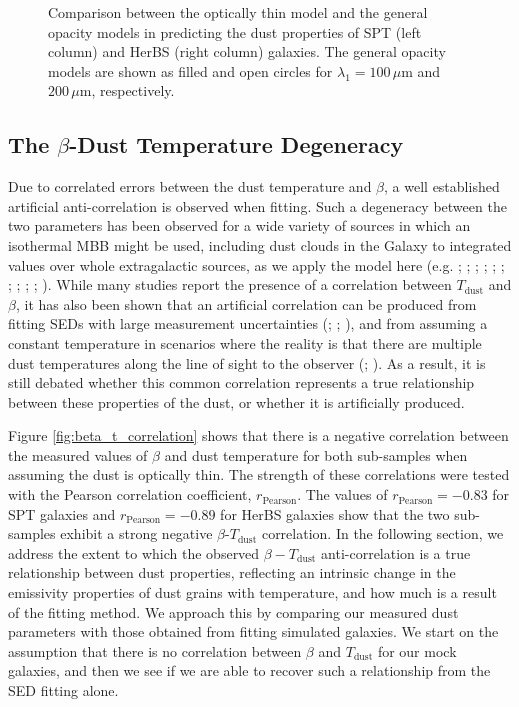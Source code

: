 \begin{figure}
	\caption[Comparison of best fitting optically thin and general opacity parameters]{Comparison between the optically thin model and the general opacity models in predicting the dust properties of SPT (left column) and HerBS (right column) galaxies. The general opacity models are shown as filled and open circles for $\lambda_1 = 100\,\mu$m and $200\,\mu$m, respectively.}
	\label{fig:comparison_optically_thin_general_opacity}
\end{figure}

\subsection{The $\beta$-Dust Temperature Degeneracy}

Due to correlated errors between the dust temperature and $\beta$, a well established artificial anti-correlation is observed when fitting. Such a degeneracy between the two parameters has been observed for a wide variety of sources in which an isothermal MBB might be used, including dust clouds in the Galaxy to integrated values over whole extragalactic sources, as we apply the model here (e.g. \citealt{Dupac_2003}; \citealt{Desert_2008}; \citealt{Paradis_2010}; \citealt{Schnee_2010}; \citealt{Veneziani_2010}; \citealt{Bracco_2011}; \citealt{Galametz_2012}; \citealt{Paladini_2012}; \citealt{Smith_2012}; \citealt{Lamperti_2019}; \citealt{daCunha_2021}). While many studies report the presence of a correlation between $T_\textrm{dust}$ and $\beta$, it has also been shown that an artificial correlation can be produced from fitting SEDs with large measurement uncertainties (\citealt{Shetty_2009a}; \citealt{Kelly_2012}; \citealt{Juvela_2012a}), and from assuming a constant temperature in scenarios where the reality is that there are multiple dust temperatures along the line of sight to the observer (\citealt{Shetty_2009b}; \citealt{Juvela_2012b}). As a result, it is still debated whether this common correlation represents a true relationship between these properties of the dust, or whether it is artificially produced.

Figure \ref{fig:beta_t_correlation} shows that there is a negative correlation between the measured values of $\beta$ and dust temperature for both sub-samples when assuming the dust is optically thin. The strength of these correlations were tested with the Pearson correlation coefficient, $r_{\textrm{Pearson}}$. The values of $r_{\textrm{Pearson}} = -0.83$ for SPT galaxies and $r_{\textrm{Pearson}} = -0.89$ for HerBS galaxies show that the two sub-samples exhibit a strong negative $\beta$-$T_{\textrm{dust}}$ correlation. In the following section, we address the extent to which the observed $\beta-T_{\textrm{dust}}$ anti-correlation is a true relationship between dust properties, reflecting an intrinsic change in the emissivity properties of dust grains with temperature, and how much is a result of the fitting method. We approach this by comparing our measured dust parameters with those obtained from fitting simulated galaxies. We start on the assumption that there is no correlation between $\beta$ and $T_{\textrm{dust}}$ for our mock galaxies, and then we see if we are able to recover such a relationship from the SED fitting alone.

